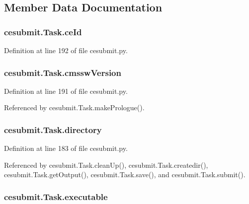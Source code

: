 \subsection{Member Data Documentation}
\subsubsection[{ce\-Id}]{\setlength{\rightskip}{0pt plus 5cm}cesubmit.\-Task.\-ce\-Id}\label{classcesubmit_1_1Task_a9888ef44d84b3fdcd0ec8d95079eba5a}


Definition at line 192 of file cesubmit.\-py.

\subsubsection[{cmssw\-Version}]{\setlength{\rightskip}{0pt plus 5cm}cesubmit.\-Task.\-cmssw\-Version}\label{classcesubmit_1_1Task_a0bf8a8d8c4c49df8c4f71964ce9fce68}


Definition at line 191 of file cesubmit.\-py.



Referenced by cesubmit.\-Task.\-make\-Prologue().

\subsubsection[{directory}]{\setlength{\rightskip}{0pt plus 5cm}cesubmit.\-Task.\-directory}\label{classcesubmit_1_1Task_a2cfde474eb274595ca1cce02f1e0b632}


Definition at line 183 of file cesubmit.\-py.



Referenced by cesubmit.\-Task.\-clean\-Up(), cesubmit.\-Task.\-createdir(), cesubmit.\-Task.\-get\-Output(), cesubmit.\-Task.\-save(), and cesubmit.\-Task.\-submit().

\subsubsection[{executable}]{\setlength{\rightskip}{0pt plus 5cm}cesubmit.\-Task.\-executable}\label{classcesubmit_1_1Task_a5c27809386cdeaffd495829a3f346431}


